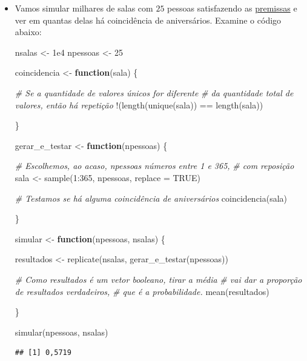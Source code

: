 \documentclass[
  11pt]{report}
\newenvironment{Shaded}{\begin{snugshade}}{\end{snugshade}}
\newcommand{\AttributeTok}[1]{\textcolor[rgb]{0.77,0.63,0.00}{#1}}
\newcommand{\CommentTok}[1]{\textcolor[rgb]{0.56,0.35,0.01}{\textit{#1}}}
\newcommand{\ConstantTok}[1]{\textcolor[rgb]{0.00,0.00,0.00}{#1}}
\newcommand{\ControlFlowTok}[1]{\textcolor[rgb]{0.13,0.29,0.53}{\textbf{#1}}}
\newcommand{\DecValTok}[1]{\textcolor[rgb]{0.00,0.00,0.81}{#1}}
\newcommand{\FloatTok}[1]{\textcolor[rgb]{0.00,0.00,0.81}{#1}}
\newcommand{\FunctionTok}[1]{\textcolor[rgb]{0.00,0.00,0.00}{#1}}
\newcommand{\NormalTok}[1]{#1}
\newcommand{\OtherTok}[1]{\textcolor[rgb]{0.56,0.35,0.01}{#1}}
\newcommand{\SpecialCharTok}[1]{\textcolor[rgb]{0.00,0.00,0.00}{#1}}
\renewenvironment{Shaded}{
    \begin{mdframed}[%
      roundcorner=2pt,%
      innerleftmargin=5pt,%
      innerrightmargin=5pt,%
      topline=true,%
      leftline=true,%
      rightline=true,%
      bottomline=true,%
      linewidth=0.5pt,%
      linecolor=black!20,%
      backgroundcolor=black!2,%
      skipabove=2ex,%
      skipbelow=2.5ex%
    ]%
  }
  {
    \end{mdframed}
  }
\begin{document}
\begin{itemize}
\item
  Vamos simular milhares de salas com $25$ pessoas satisfazendo as \protect\hyperlink{premissas}{premissas} e ver em quantas delas há coincidência de aniversários. Examine o código abaixo:

\begin{Shaded}
\begin{Highlighting}[]
\NormalTok{nsalas }\OtherTok{\textless{}{-}} \FloatTok{1e4}
\NormalTok{npessoas }\OtherTok{\textless{}{-}} \DecValTok{25}

\NormalTok{coincidencia }\OtherTok{\textless{}{-}} \ControlFlowTok{function}\NormalTok{(sala) \{}

  \CommentTok{\# Se a quantidade de valores únicos for diferente }
  \CommentTok{\# da quantidade total de valores, então há repetição  }
  \SpecialCharTok{!}\NormalTok{(}\FunctionTok{length}\NormalTok{(}\FunctionTok{unique}\NormalTok{(sala)) }\SpecialCharTok{==} \FunctionTok{length}\NormalTok{(sala))}

\NormalTok{\}}

\NormalTok{gerar\_e\_testar }\OtherTok{\textless{}{-}} \ControlFlowTok{function}\NormalTok{(npessoas) \{}

  \CommentTok{\# Escolhemos, ao acaso, npessoas números entre 1 e 365,}
  \CommentTok{\# com reposição}
\NormalTok{  sala }\OtherTok{\textless{}{-}} \FunctionTok{sample}\NormalTok{(}\DecValTok{1}\SpecialCharTok{:}\DecValTok{365}\NormalTok{, npessoas, }\AttributeTok{replace =} \ConstantTok{TRUE}\NormalTok{)}

  \CommentTok{\# Testamos se há alguma coincidência de aniversários}
  \FunctionTok{coincidencia}\NormalTok{(sala)}

\NormalTok{\}}

\NormalTok{simular }\OtherTok{\textless{}{-}} \ControlFlowTok{function}\NormalTok{(npessoas, nsalas) \{}

\NormalTok{  resultados }\OtherTok{\textless{}{-}} \FunctionTok{replicate}\NormalTok{(nsalas, }\FunctionTok{gerar\_e\_testar}\NormalTok{(npessoas))}

  \CommentTok{\# Como resultados é um vetor booleano, tirar a média}
  \CommentTok{\# vai dar a proporção de resultados verdadeiros,}
  \CommentTok{\# que é a probabilidade.}
  \FunctionTok{mean}\NormalTok{(resultados)}

\NormalTok{\}}

\FunctionTok{simular}\NormalTok{(npessoas, nsalas)}
\end{Highlighting}
\end{Shaded}

\begin{verbatim}
## [1] 0,5719
\end{verbatim}
\end{itemize}
\end{document}
